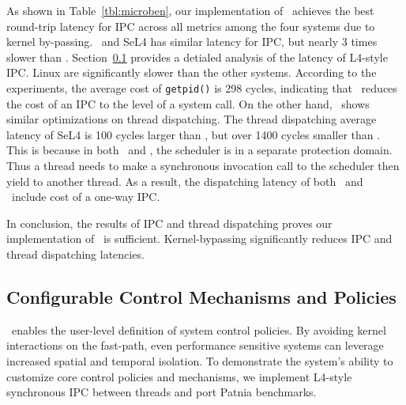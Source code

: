 As shown in Table~\ref{tbl:microben}, our implementation of \name\ achieves the best round-trip latency for IPC across all metrics among the four systems due to kernel by-passing.
\cos\ and SeL4 has similar latency for IPC, but nearly 3 times slower than \name .
Section~\ref{ss:eval_config} provides a detialed analysis of the latency of L4-style IPC.
Linux {\pipes} are significantly slower than the other systems.
According to the experiments, the average cost of {\tt getpid()} is 298 cycles, indicating that \name\ reduces the cost of an IPC to the level of a system call.
On the other hand, \name\ shows similar optimizations on thread dispatching.
The thread dispatching average latency of SeL4 is 100 cycles larger than \name , but over 1400 cycles smaller than \cos .
This is because in both \name\ and \cos , the scheduler is in a separate protection domain.
Thus a thread needs to make a synchronous invocation call to the scheduler then yield to another thread.
As a result, the dispatching latency of both \cos\ and \name\ include cost of a one-way IPC.

In conclusion, the results of IPC and thread dispatching proves our implementation of \name\ is sufficient.
Kernel-bypassing significantly reduces IPC and thread dispatching latencies.


\subsection{Configurable Control Mechanisms and Policies}
\label{ss:eval_config}

\name\ enables the user-level definition of system control policies.
By avoiding kernel interactions on the fast-path, even performance sensitive systems can leverage increased spatial and temporal isolation.
To demonstrate the system's ability to customize core control policies and mechanisms, we implement L4-style synchronous IPC between threads and port Patnia benchmarks.

